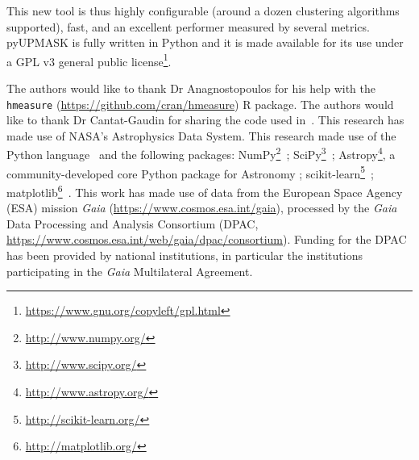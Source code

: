 \documentclass[draft]{aa}
\begin{document}
 This new tool is thus highly configurable (around a dozen clustering
 algorithms supported), fast, and an excellent performer measured by
 several metrics.
 pyUPMASK is fully written in Python and it is made available for its use
 under a GPL v3 general public
 license\footnote{\url{https://www.gnu.org/copyleft/gpl.html}}.






\begin{acknowledgements}
The authors would like to thank Dr Anagnostopoulos for his help with the
\texttt{hmeasure} (\url{https://github.com/cran/hmeasure}) R package.
%
The authors would like to thank Dr Cantat-Gaudin for sharing the code used
in~\cite{Cantat_2018}.
%
This research has made use of NASA's Astrophysics Data System.
%
This research made use of the Python language~\citep{vanRossum_1995}
and the following packages:
NumPy\footnote{\url{http://www.numpy.org/}}~\citep{vanDerWalt_2011};
SciPy\footnote{\url{http://www.scipy.org/}}~\citep{Jones_2001};
Astropy\footnote{\url{http://www.astropy.org/}}, a community-developed core Python
package for Astronomy \citep{astropy:2013,astropy:2018};
scikit-learn\footnote{\url{http://scikit-learn.org/}}~\citep{pedregosa_2011};
matplotlib\footnote{\url{http://matplotlib.org/}}~\citep{hunter_2007}.
%
This work has made use of data from the European Space Agency (ESA) mission
{\it Gaia} (\url{https://www.cosmos.esa.int/gaia}), processed by the {\it Gaia}
Data Processing and Analysis Consortium (DPAC,
\url{https://www.cosmos.esa.int/web/gaia/dpac/consortium}). Funding for the DPAC
has been provided by national institutions, in particular the institutions
participating in the {\it Gaia} Multilateral Agreement.
\end{acknowledgements}










\end{document}
